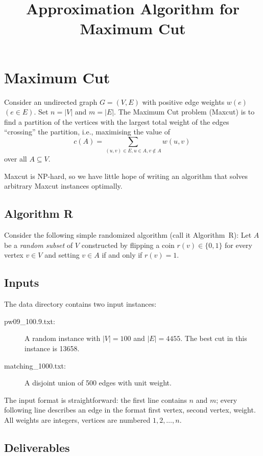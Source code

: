 \documentclass{tufte-handout}
\title{\sf Approximation Algorithm for Maximum Cut}
\begin{document}
\maketitle
{}

\section{Maximum Cut}
Consider an undirected graph $G=(V,E)$ with positive edge weights
$w(e)$ $(e\in E)$.
Set $n=|V|$ and $m=|E|$.
The Maximum Cut problem (Maxcut) is to find a partition of the
vertices with the largest total weight of the edges ``crossing'' the
partition, i.e., maximising the value of \[c(A)= \sum_{(u,v)\in E,
  u\in A, v\notin A} w(u,v)\,\] over all $A\subseteq V$.

Maxcut is NP-hard, so we have little hope of writing an algorithm that
solves arbitrary Maxcut instances optimally.

\subsection{ Algorithm R}

Consider the following simple randomized algorithm (call it
Algorithm~R): Let $A$ be a \emph{random subset} of $V$ constructed by
flipping a coin $r(v)\in\{0,1\}$ for every vertex $v\in V$ and setting
$v\in A$ if and only if $r(v)=1$.

\subsection{ Inputs}

The  data directory contains two input instances:
\begin{description}
\item[ pw09\_100.9.txt:] A random instance with $|V|=100$ and
  $|E|=4455$. The best cut in this instance is
  13658.
\item[ matching\_1000.txt:] A disjoint union of 500 edges with unit weight.
\end{description}

The input format is straightforward: the first line contains $n$ and
$m$; every following line describes an edge in the format first
vertex, second vertex, weight.
All weights are integers, vertices are numbered $1,2,\ldots, n$.

\subsection{ Deliverables}
\end{document}
